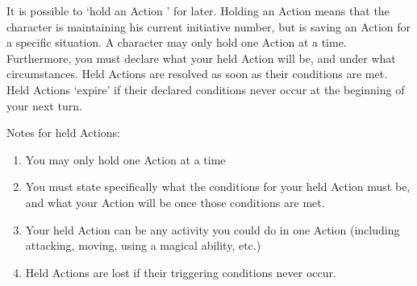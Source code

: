 \documentclass[twoside]{book}
\begin{document}
  
    {  
     It is possible to `hold an Action ' for
             later. Holding an Action means that the character is
             maintaining his current initiative number, but is saving an
             Action for a specific situation. A character may only hold
             one Action at a time. Furthermore, you must declare what
             your held Action will be, and under what circumstances. Held
             Actions are resolved as soon as their conditions are met.
             Held Actions `expire' if their declared
             conditions never occur at the beginning of your next turn.
             
    }
  
  

  

  
    {  
     Notes for held Actions: 
    }
  
\begin{enumerate}
      
  \item   
              
    {  
      You may only hold one Action at a time 
    }
    
            
  \item   
                
    {  
      You must state specifically what the conditions
                 for your held Action must be, and what your Action will
                 be once those conditions are met. 
    }
  
            
  \item   
                
    {  
      Your held Action can be any activity you could do
                 in one Action (including attacking, moving, using a
                 magical ability, etc.) 
    }
  
            
  \item   
                
    {  
      Held Actions are lost if their triggering
                 conditions never occur. 
    }
  
            
\end{enumerate}
  
\end{document}
